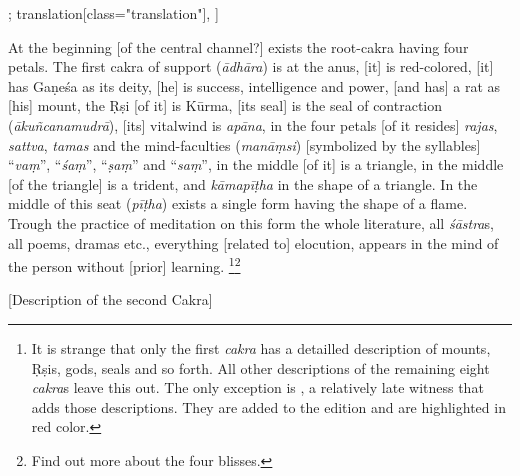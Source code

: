 \documentclass[12pt]{article}%
\def\om{\textrm{\foreignlanguage{english}{\footnotesize omitted in\ }}} %
\begin{document}
\begin{alignment}[
    texts=edition[class="edition"];
    translation[class="translation"],
  ]
\begin{translation}
 \begin{tlate}At the beginning [of the central channel?] exists the root-cakra having four petals. The first cakra of support (\textit{ādhāra}) is at the anus, [it] is red-colored, [it] has Gaṇeśa as its deity, [he] is success, intelligence and power, [and has] a rat as [his] mount, the Ṛṣi [of it] is Kūrma, [its seal] is the seal of contraction (\textit{ākuñcanamudrā}), [its] vitalwind is \textit{apāna},  in the four petals [of it resides] \textit{rajas}, \textit{sattva}, \textit{tamas} and the mind-faculties (\textit{manāṃsi}) [symbolized by the syllables] “\textit{vaṃ}”, “\textit{śaṃ}”, “\textit{ṣaṃ}” and “\textit{saṃ}”, in the middle [of it] is a triangle, in the middle [of the triangle] is a trident, and \textit {kāmapīṭha} in the shape of a triangle. In the middle of this seat (\textit{pīṭha}) exists a single form having the shape of a flame. Trough the practice of meditation on this form the whole literature, all \textit{śāstra}s, all poems, dramas etc., everything [related to] elocution, appears in the mind of the person without [prior] learning. \footnote{It is strange that only the first \textit{cakra} has a detailled description of mounts, Ṛṣis, gods, seals and so forth. All other descriptions of the remaining eight \textit{cakra}s leave this out. The only exception is , a relatively late witness that adds those descriptions. They are added to the edition and are highlighted in red color.}\footnote{Find out more about the four blisses.} \end{tlate}
   \end{translation}
   \begin{edition}
     \bigskip
    \centerline{\textrm{\small{[Description of the second Cakra]}}}
    \bigskip
    \begin{prose}

\end{prose}
\end{edition}
\end{alignment}
\end{document}

